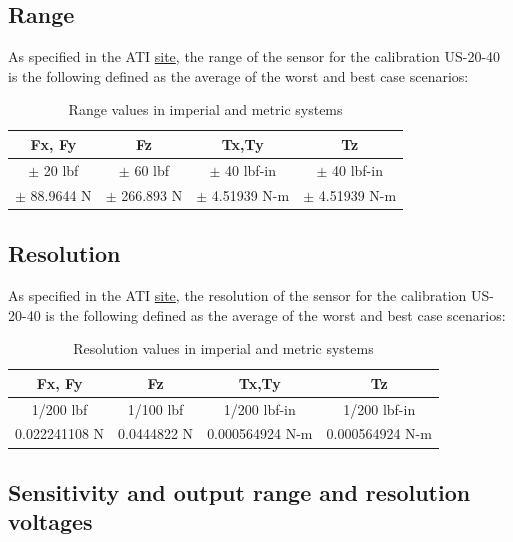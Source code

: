 \documentclass[a4paper]{article}
\begin{document}
\subsection{Range}
As specified in the ATI \hyperref{https://www.ati-ia.com/products/ft/ft_models.aspx?id=mini40}{category}{name}{site}, the range of the sensor for the calibration US-20-40 is the following defined as the average of the worst and best case
scenarios:

\begin{table}[h!]
	\centering
	\caption{Range values in imperial and metric systems\label{tab:range}}
	\begin{tabular}{||c | c | c | c||} 
		\hline
		Fx, Fy & Fz & Tx,Ty & Tz \\ [0.5ex] 
		\hline\hline
		$\pm$ 20 lbf & $\pm$ 60 lbf & $\pm$ 40 lbf-in & $\pm$ 40 lbf-in\\ 
		\hline
		$\pm$ 88.9644 N & $\pm$ 266.893 N & $\pm$ 4.51939 N-m & $\pm$ 4.51939 N-m \\
		\hline
		
	\end{tabular}
\end{table}

\subsection{Resolution}
As specified in the ATI \hyperref{https://www.ati-ia.com/products/ft/ft_models.aspx?id=mini40}{category}{name}{site}, the resolution of the sensor for the calibration US-20-40 is the following defined as the average of the worst and best case
scenarios:

\begin{table}[h!]
	\centering
	\caption{Resolution values in imperial and metric systems\label{tab:resolution}}
	\begin{tabular}{||c | c | c | c||} 
		\hline
		Fx, Fy & Fz & Tx,Ty & Tz \\ [0.5ex] 
		\hline\hline
		1/200 lbf & 1/100 lbf & 1/200 lbf-in & 1/200 lbf-in\\ 
		\hline
		0.022241108 N & 0.0444822 N & 0.000564924 N-m & 0.000564924 N-m \\
		\hline
	\end{tabular}
\end{table}

\subsection{Sensitivity and output range and resolution voltages}
\end{document}
